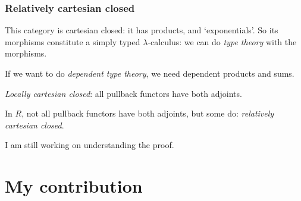 \documentclass[aspectratio=169]{fancyslides} %
\begin{document}
  \begin{frame}[fragile]
    \frametitle{Relatively cartesian closed}
    This category is cartesian closed: it has products, and `exponentials'. So its morphisms constitute a simply typed $ \lambda $-calculus: we can do \textit{type theory} with the morphisms.

    \pause

    If we want to do \textit{dependent type theory}, we need dependent products and sums.

    \begin{center}
    \end{center}

    \textit{Locally cartesian closed}: all pullback functors have both adjoints.

    \pause

    In $ R $, not all pullback functors have both adjoints, but some do: \textit{relatively cartesian closed}.

    \pause

    I am still working on understanding the proof.
  \end{frame}

  \section{My contribution}
  \begin{frame}[fragile]
    \begin{columns}
      \begin{column}{.5\textwidth}
        \tableofcontents[currentsection]
      \end{column}
      \begin{column}{.5\textwidth}
      \end{column}
    \end{columns}
  \end{frame}
\end{document}
